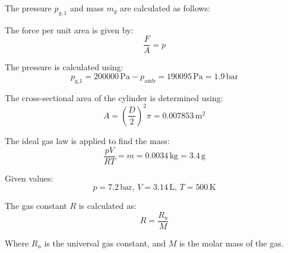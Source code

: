 The pressure \( p_{g,1} \) and mass \( m_g \) are calculated as follows:  

The force per unit area is given by:  
\[
\frac{F}{A} = p
\]  

The pressure is calculated using:  
\[
p_{\text{g,1}} = 200000 \, \text{Pa} - p_{\text{amb}} = 190095 \, \text{Pa} = 1.9 \, \text{bar}
\]  

The cross-sectional area of the cylinder is determined using:  
\[
A = \left(\frac{D}{2}\right)^2 \pi = 0.007853 \, \text{m}^2
\]  

The ideal gas law is applied to find the mass:  
\[
\frac{pV}{RT} = m = 0.0034 \, \text{kg} = 3.4 \, \text{g}
\]  

Given values:  
\[
p = 7.2 \, \text{bar}, \, V = 3.14 \, \text{L}, \, T = 500 \, \text{K}
\]  

The gas constant \( R \) is calculated as:  
\[
R = \frac{R_u}{M}
\]  

Where \( R_u \) is the universal gas constant, and \( M \) is the molar mass of the gas.